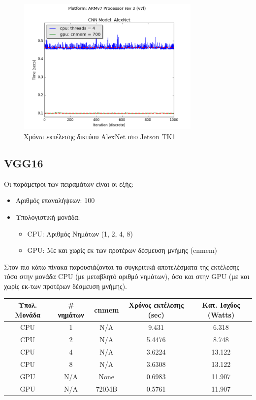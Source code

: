 \begin{figure}[!ht]
  \centering
  \includegraphics[width=0.8\textwidth]{./images/chapter6/benchmark_alexnet_jetson.png}
  \caption[Χρόνoι εκτέλεσης δικτύου AlexNet στο Jetson TK1]{Χρόνoι εκτέλεσης δικτύου AlexNet στο Jetson TK1}
  \label{fig:alexnet_results_jetson}
\end{figure}



\subsection{VGG16}

Οι παράμετροι των πειραμάτων είναι οι εξής:
\begin{itemize}
  \item{Αριθμός επαναλήψεων: 100}
  \item{Υπολογιστική μονάδα:}
    \begin{itemize}
      \item{CPU: Αριθμός Νημάτων (1, 2, 4, 8)}
      \item{GPU: Με και χωρίς εκ των προτέρων δέσμευση μνήμης (cnmem)}
    \end{itemize}
\end{itemize}

Στον πιο κάτω πίνακα παρουσιάζονται τα συγκριτικά αποτελέσματα της
εκτέλεσης τόσο στην μονάδα CPU (με μεταβλητό αριθμό νημάτων), όσο και στην
GPU (με και χωρίς εκ-των προτέρων δέσμευση μνήμης).

\begin{center}
  \small
  \begin{tabular}[center]{ | c | c | c | c | c | }
    \hline
    \rowcolor{Gray}
    Υπολ. Μονάδα & \# νημάτων & cnmem & Χρόνος εκτέλεσης (sec) & Κατ. Ισχύος (Watts) \\
    \hline
    CPU & 1 & N/A & 9.431 & 6.318 \\
    CPU & 2 & N/A & 5.4476 &  8.748\\
    CPU & 4 & N/A & 3.6224 & 13.122\\
    CPU & 8 & N/A & 3.6308 & 13.122\\
    GPU & N/A & None & 0.6983 & 11.907\\
    GPU & N/A & 720MB & 0.5761 & 11.907\\
    \hline
  \end{tabular}
\end{center}

